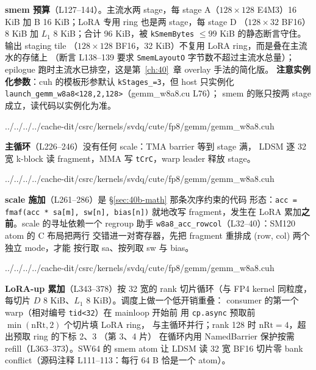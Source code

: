 \textbf{smem 预算}（L127--144）。主流水两 stage，每 stage A（$128\times128$
E4M3）16 KiB 加 B 16 KiB；LoRA 专用 ring 也是两 stage，每 stage D
（$128\times32$ BF16）8 KiB 加 $L_1$ 8 KiB；合计 96 KiB，被
\texttt{kSmemBytes} $\le 99$ KiB 的静态断言守住。输出 staging tile
（$128\times128$ BF16，32 KiB）不复用 LoRA ring，而是叠在主流水的存储上
（断言 L138--139 要求 \texttt{SmemLayoutO} 字节数不超过主流水总量）；
epilogue 跑时主流水已排空，这是第~\ref{ch:40}~章 overlay 手法的简化版。
\textbf{注意实例化参数}：cuh 的模板形参默认 \texttt{kStages\_=3}，但 host
只实例化 \texttt{launch\_gemm\_w8a8<128,2,128>}（gemm\_w8a8.cu L76）；
smem 的账只按两 stage 成立，读代码以实例化为准。

\begin{lstinputlisting}[linerange={127-144},firstnumber=auto,
  title={gemm\_w8a8.cuh L127--144（两 stage 主流水加 LoRA ring 的 96 KiB 预算与 overlay 断言）}]{../../../../cache-dit/csrc/kernels/svdq/cute/fp8/gemm/gemm_w8a8.cuh}
\end{lstinputlisting}

\textbf{主循环}（L226--246）没有任何 scale：TMA barrier 等到 stage 满，
LDSM 逐 32 宽 k-block 读 fragment，MMA 写 \texttt{tCrC}，warp leader
释放 stage。

\begin{lstinputlisting}[linerange={226-246},firstnumber=auto,
  title={gemm\_w8a8.cuh L226--246（gemm\_fp8\_main：无 scale 的 E4M3 主循环）}]{../../../../cache-dit/csrc/kernels/svdq/cute/fp8/gemm/gemm_w8a8.cuh}
\end{lstinputlisting}

\textbf{scale 施加}（L261--286）是 §\ref{sec:40b-math} 那条次序约束的代码
形态：\texttt{acc = fmaf(acc * sa[m], sw[n], bias[n])} 就地改写
fragment，发生在 LoRA 累加\textbf{之前}。scale 的寻址依赖一个 regroup
助手 \texttt{w8a8\_acc\_rowcol}（L32--40）：SM120 atom 的 C 布局把两行
交错进一对寄存器，先把 fragment 重排成 (row, col) 两个独立 mode，才能
按行取 sa、按列取 sw 与 bias。

\begin{lstinputlisting}[linerange={261-286},firstnumber=auto,
  title={gemm\_w8a8.cuh L261--286（apply\_scales：先乘 sa 再 LoRA 累加的次序固化）}]{../../../../cache-dit/csrc/kernels/svdq/cute/fp8/gemm/gemm_w8a8.cuh}
\end{lstinputlisting}

\textbf{LoRA-up 累加}（L343--378）按 32 宽的 rank 切片循环（与 FP4 kernel
同粒度，每切片 $D$ 8 KiB、$L_1$ 8 KiB）。调度上做一个低开销重叠：
consumer 的第一个 warp（相对编号 \texttt{tid<32}）在 mainloop 开始前
用 \texttt{cp.async} 预取前 $\min(\mathrm{nRt},2)$ 个切片填 LoRA ring，
与主循环并行；rank 128 时 $\mathrm{nRt}=4$，超出预取 ring 的下标 2、3
（第 3、4 片）
在循环内用 NamedBarrier 保护按需 refill（L363--373）。SW64 的 smem atom
让 LDSM 读 32 宽 BF16 切片零 bank conflict（源码注释 L111--113：每行
64 B 恰是一个 atom）。

